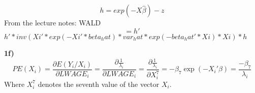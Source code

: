 \documentclass[11pt]{article}
\theoremstyle{break}
\begin{document}
\subsection{}
$$h = exp(-X\hat{\beta}) - z$$
From the lecture notes: WALD $$=h'$$
$h'*inv(Xi'*exp(-Xi'*beta_hat)*var_hat*exp(-beta_hat'*Xi)*Xi)*h$

\textbf{1f)}
$$PE(X_i) = \frac{\partial E(Y_i/X_i)}{\partial LWAGE_i} = \frac{\partial{\frac{1}{\lambda_i}}}{\partial LWAGE_i} = \frac{\partial{\frac{1}{\lambda_i}}}{\partial X_i^7} = -\beta_7\exp(-X_i'\beta) = \frac{-\beta_7}{\lambda_i}$$ Where $X_i^7$ denotes the seventh value of the vector $X_i$.
\end{document}
